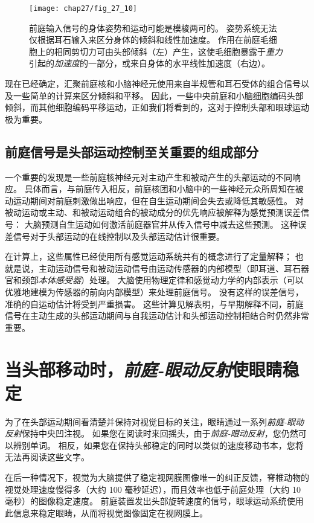 \begin{figure}[htbp]
	\centering
	\texttt{[image: chap27/fig\_27\_10]}
	\caption{前庭输入信号的身体姿势和运动可能是模棱两可的。
		姿势系统无法仅根据耳石输入来区分身体的倾斜和线性加速度。
		作用在前庭毛细胞上的相同剪切力可由头部倾斜（左）产生，这使毛细胞暴露于\textit{重力}引起的\textit{加速度}的一部分，或来自身体的水平线性加速度（右边）。}
	\label{fig:27_10}
\end{figure}


现在已经确定，汇聚前庭核和小脑神经元使用来自半规管和耳石受体的组合信号以及一些简单的计算来区分倾斜和平移。
因此，一些中央前庭和小脑细胞编码头部倾斜，而其他细胞编码平移运动，正如我们将看到的，这对于控制头部和眼球运动极为重要。



\subsection{前庭信号是头部运动控制至关重要的组成部分}

一个重要的发现是一些前庭核神经元对主动产生和被动产生的头部运动的不同响应。
具体而言，与前庭传入相反，前庭核团和小脑中的一些神经元众所周知在被动运动期间对前庭刺激做出响应，但在自生运动期间会失去或降低其敏感性。
对被动运动或主动、和被动运动组合的被动成分的优先响应被解释为感觉预测误差信号：
大脑预测自生运动如何激活前庭器官并从传入信号中减去这些预测。
这种误差信号对于头部运动的在线控制以及头部运动估计很重要。


在计算上，这些属性已经使用所有感觉运动系统共有的概念进行了定量解释；
也就是说，主动运动信号和被动运动信号由运动传感器的内部模型（即耳道、耳石器官和颈部\textit{本体感受器}）处理。
大脑使用物理定律和感觉动力学的内部表示（可以优雅地建模为传感器的前向内部模型）来处理前庭信号。
没有这样的误差信号，准确的自运动估计将受到严重损害。
这些计算见解表明，与早期解释不同，前庭信号在主动生成的头部运动期间与自我运动估计和头部运动控制相结合时仍然非常重要。



\section{当头部移动时，\textit{前庭-眼动反射}使眼睛稳定}

为了在头部运动期间看清楚并保持对视觉目标的关注，眼睛通过一系列\textit{前庭-眼动反射}保持中央凹注视。
如果您在阅读时来回摇头，由于\textit{前庭-眼动反射}，您仍然可以辨别单词。
相反，如果您在保持头部稳定的同时以类似的速度移动书本，您将无法再阅读这些文字。


在后一种情况下，视觉为大脑提供了稳定视网膜图像唯一的纠正反馈，脊椎动物的视觉处理速度慢得多（大约 100 毫秒延迟），而且效率也低于前庭处理（大约 10 毫秒）的图像稳定速度。
前庭装置发出头部旋转速度的信号，眼球运动系统使用此信息来稳定眼睛，从而将视觉图像固定在视网膜上。


